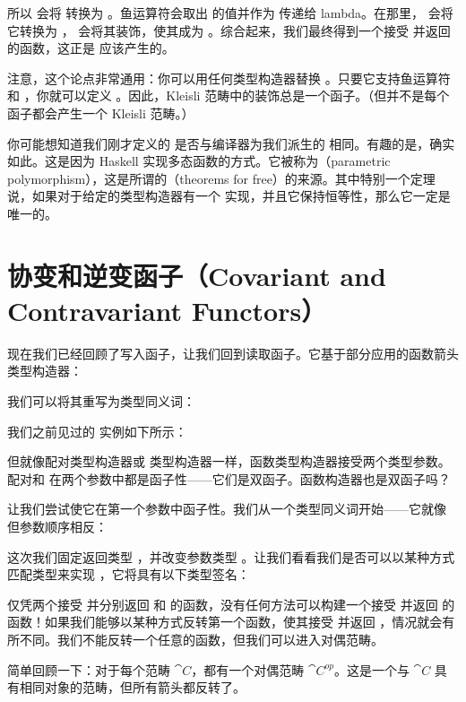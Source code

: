 所以  会将  转换为 。鱼运算符会取出  的值并作为  传递给 lambda。在那里， 会将它转换为 ， 会将其装饰，使其成为 。综合起来，我们最终得到一个接受  并返回  的函数，这正是  应该产生的。

注意，这个论点非常通用：你可以用任何类型构造器替换 。只要它支持鱼运算符和 ，你就可以定义 。因此，Kleisli 范畴中的装饰总是一个函子。（但并不是每个函子都会产生一个 Kleisli 范畴。）

你可能想知道我们刚才定义的  是否与编译器为我们派生的  相同。有趣的是，确实如此。这是因为 Haskell 实现多态函数的方式。它被称为（parametric polymorphism），这是所谓的（theorems for free）的来源。其中特别一个定理说，如果对于给定的类型构造器有一个  实现，并且它保持恒等性，那么它一定是唯一的。

\section{协变和逆变函子（Covariant and Contravariant Functors）}

现在我们已经回顾了写入函子，让我们回到读取函子。它基于部分应用的函数箭头类型构造器：

我们可以将其重写为类型同义词：

我们之前见过的  实例如下所示：

但就像配对类型构造器或  类型构造器一样，函数类型构造器接受两个类型参数。配对和  在两个参数中都是函子性——它们是双函子。函数构造器也是双函子吗？

让我们尝试使它在第一个参数中函子性。我们从一个类型同义词开始——它就像  但参数顺序相反：

这次我们固定返回类型 ，并改变参数类型 。让我们看看我们是否可以以某种方式匹配类型来实现 ，它将具有以下类型签名：

仅凭两个接受  并分别返回  和  的函数，没有任何方法可以构建一个接受  并返回  的函数！如果我们能够以某种方式反转第一个函数，使其接受  并返回 ，情况就会有所不同。我们不能反转一个任意的函数，但我们可以进入对偶范畴。

简单回顾一下：对于每个范畴 $\cat{C}$，都有一个对偶范畴 $\cat{C}^\mathit{op}$。这是一个与 $\cat{C}$ 具有相同对象的范畴，但所有箭头都反转了。

